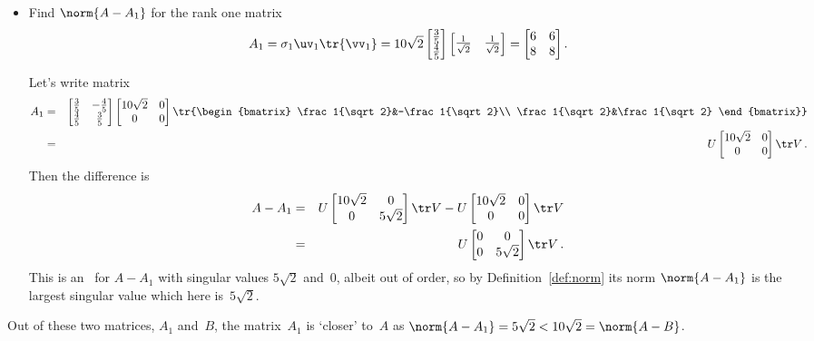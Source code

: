 \begin{example}
\begin{enumerate}
\begin{itemize}
\item Find \(\norm{A-A_1}\) for the rank one matrix 
\begin{equation*}
A_1=\sigma_1\uv_1\tr{\vv_1}
=10\sqrt2\begin{bmatrix} \frac35\\\frac45 \end{bmatrix}
\begin{bmatrix} \frac1{\sqrt2}&\frac1{\sqrt2} \end{bmatrix}
=\begin{bmatrix} 6&6\\8&8 \end{bmatrix}.
\end{equation*}
\begin{solution} 
Let's write matrix
\begin{eqnarray*}
A_1&=&\begin{bmatrix} \frac35&-\frac45\\\frac45&\frac35 \end{bmatrix}
\begin{bmatrix} 10\sqrt2&0\\0&0 \end{bmatrix}
\tr{\begin{bmatrix} \frac1{\sqrt2}&-\frac1{\sqrt2}\\ \frac1{\sqrt2}&\frac1{\sqrt2} \end{bmatrix}}
\\&=&U\begin{bmatrix} 10\sqrt2&0\\0&0 \end{bmatrix}\tr V\,.
\end{eqnarray*}
Then the difference is
\begin{eqnarray*}
A-A_1&=&U\begin{bmatrix} 10\sqrt2&0\\0&5\sqrt2 \end{bmatrix}\tr V
-U\begin{bmatrix} 10\sqrt2&0\\0&0 \end{bmatrix}\tr V
\\&=&U\begin{bmatrix} 0&0\\0&5\sqrt2 \end{bmatrix}\tr V\,.
\end{eqnarray*}
This is an \svd\ for \(A-A_1\) with singular values \(5\sqrt2\) and~\(0\), albeit out of order, so by Definition~\ref{def:norm} its norm \(\norm{A-A_1}\) is the largest singular value which here is~\(5\sqrt2\).
\end{solution}
\end{itemize}
Out of these two matrices, \(A_1\) and~\(B\), the matrix~\(A_1\) is `closer' to~\(A\) as \(\norm{A-A_1}=5\sqrt2<10\sqrt2=\norm{A-B}\).
\end{enumerate}
\end{example}




